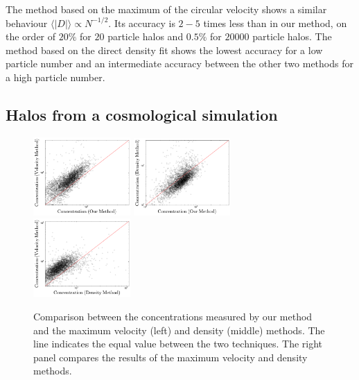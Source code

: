 \documentclass[a4,useAMS,usenatbib,usegraphicx]{mn2e}
\newcommand{\avg}[1]{\langle{#1}\rangle}
\begin{document}
The method based on the maximum of the circular velocity shows a similar
behaviour $\avg{|D|}\propto N^{-1/2}$. 
Its accuracy is $2-5$ times less
than in our method, on the order of $20\%$ for $20$ particle halos and
$0.5\%$ for $20000$ particle halos. 
The method based on the direct density
fit shows the lowest accuracy for a low particle number and an intermediate
accuracy between the other two methods for a high particle number.

\subsection{Halos from a cosmological simulation}


\label{sec:data}
\begin{figure}
  \begin{center}
    \includegraphics[width=0.33\textwidth]{mass-velocity.pdf}
    \includegraphics[width=0.33\textwidth]{mass-density.pdf}
    \includegraphics[width=0.33\textwidth]{density-velocity.pdf}
  \end{center}
  \caption{Comparison between the concentrations measured by our
    method and the maximum velocity (left) and density (middle)
    methods. The line indicates the equal value between the two
    techniques. The right panel compares the results of the maximum
    velocity and density methods.
  \label{fig:mdv}}
\end{figure}
\end{document}
